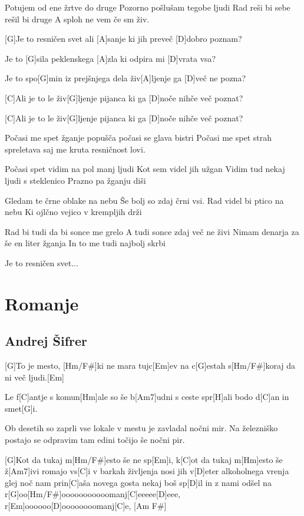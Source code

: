 \documentclass[a4paper,12pt]{article}
\begin{document}
\begin{multicols}{2}
\begin{guitar}
Potujem od ene žrtve do druge
Pozorno pošlušam tegobe ljudi
Rad reši bi sebe rešil bi druge
A sploh ne vem če sm živ.


[G]Je to resničen svet ali [A]sanje 
ki jih preveč [D]dobro poznam?


Je to [G]sila peklenskega [A]zla 
ki odpira mi [D]vrata vsa?


Je to spo[G]min iz prejšnjega dela 
živ[A]ljenje ga [D]več ne pozna?


[C]Ali je to le živ[G]ljenje pijanca 
ki ga [D]noče nihče več poznat?


[C]Ali je to le živ[G]ljenje pijanca 
ki ga [D]noče nihče več poznat?


Počasi me spet žganje popušča
počasi se glava bistri
Počasi me spet strah spreletava
saj me kruta resničnost lovi.


Počasi spet vidim na pol manj ljudi
Kot sem videl jih užgan
Vidim tud nekaj ljudi s steklenico
Prazno pa žganju diši


Gledam te črne oblake na nebu
Še bolj so zdaj črni vsi.
Rad videl bi ptico na nebu
Ki ojlčno vejico v krempljih drži


Rad bi tudi da bi sonce me grelo
A tudi sonce zdaj več ne živi
Nimam denarja za še en liter žganja
In to me tudi najbolj skrbi


Je to resničen svet...

\end{guitar}
\section{Romanje}
\subsection*{Andrej Šifrer}
\begin{guitar}

[G]To je mesto, [Hm/F#]ki ne mara tujc[Em]ev
na c[G]estah s[Hm/F#]koraj da ni več ljudi.[Em]

Le f[C]antje s komun[Hm]ale so še b[Am7]udni
s ceste spr[H]ali bodo d[C]an in smet[G]i.
 

Ob desetih so zaprli vse lokale
v mestu je zavladal nočni mir.
Na železniško postajo se odpravim
tam edini točijo še nočni pir.


[G]Kot da tukaj m[Hm/F#]esto še ne sp[Em]i,
k[C]ot da tukaj m[Hm]esto še ž[Am7]ivi
romajo vs[C]i v barkah življenja
nosi jih v[D]eter alkoholnega vrenja
glej noč nam prin[C]aša novega gosta
nekaj boš sp[D]il in z nami odšel
na r[G]oo[Hm/F#]ooooooooooomanj[C]eeeee[D]eee,
r[Em]oooooo[D]oooooooomanj[C]e, [Am F#]


\end{guitar}
\end{multicols}
\end{document}
